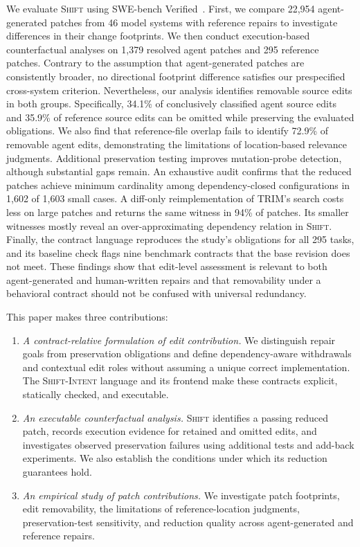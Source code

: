 \documentclass[a4paper,fleqn]{cas-sc}
\newcommand{\tool}{\textsc{Shift}}
\newcommand{\dsl}{\textsc{Shift-Intent}}
\begin{document}
We evaluate \tool{} using SWE-bench Verified~\citep{jimenez2024swebench,chowdhury2024verified}. First, we compare 22,954 agent-generated patches from 46 model systems with reference repairs to investigate differences in their change footprints. We then conduct execution-based counterfactual analyses on 1,379 resolved agent patches and 295 reference patches. Contrary to the assumption that agent-generated patches are consistently broader, no directional footprint difference satisfies our prespecified cross-system criterion. Nevertheless, our analysis identifies removable source edits in both groups. Specifically, 34.1\% of conclusively classified agent source edits and 35.9\% of reference source edits can be omitted while preserving the evaluated obligations. We also find that reference-file overlap fails to identify 72.9\% of removable agent edits, demonstrating the limitations of location-based relevance judgments. Additional preservation testing improves mutation-probe detection, although substantial gaps remain. An exhaustive audit confirms that the reduced patches achieve minimum cardinality among dependency-closed configurations in 1,602 of 1,603 small cases. A diff-only reimplementation of TRIM's search costs less on large patches and returns the same witness in 94\% of patches. Its smaller witnesses mostly reveal an over-approximating dependency relation in \tool{}. Finally, the contract language reproduces the study's obligations for all 295 tasks, and its baseline check flags nine benchmark contracts that the base revision does not meet. These findings show that edit-level assessment is relevant to both agent-generated and human-written repairs and that removability under a behavioral contract should not be confused with universal redundancy.

This paper makes three contributions:
\begin{enumerate}
\item \emph{A contract-relative formulation of edit contribution.} We distinguish repair goals from preservation obligations and define dependency-aware withdrawals and contextual edit roles without assuming a unique correct implementation. The \dsl{} language and its frontend make these contracts explicit, statically checked, and executable.
\item \emph{An executable counterfactual analysis.} \tool{} identifies a passing reduced patch, records execution evidence for retained and omitted edits, and investigates observed preservation failures using additional tests and add-back experiments. We also establish the conditions under which its reduction guarantees hold.
\item \emph{An empirical study of patch contributions.} We investigate patch footprints, edit removability, the limitations of reference-location judgments, preservation-test sensitivity, and reduction quality across agent-generated and reference repairs.
\end{enumerate}
\end{document}
